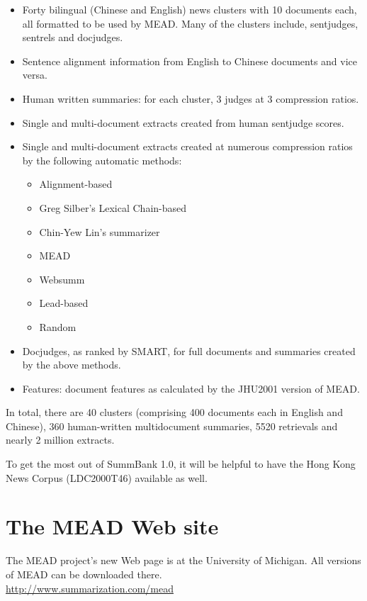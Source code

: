 \documentclass[10pt]{article}
\begin{document}
\begin{itemize}
\item Forty bilingual (Chinese and English) news clusters with 10 documents each, all 
formatted to be used by MEAD.  Many of the clusters include, sentjudges, sentrels and 
docjudges.
\item Sentence alignment information from English to Chinese documents and vice versa.
\item Human written summaries: for each cluster, 3 judges at 3 compression ratios. 
\item Single and multi-document extracts created from human sentjudge scores.
\item Single and multi-document extracts created at numerous compression ratios by the 
following automatic methods:
    \begin{itemize}
    \item Alignment-based
    \item Greg Silber's Lexical Chain-based
    \item Chin-Yew Lin's summarizer
    \item MEAD
    \item Websumm 
    \item Lead-based
    \item Random
    \end{itemize}
\item Docjudges, as ranked by SMART, for full documents and summaries created by the 
above methods.

\item Features: document features as calculated by the JHU2001 version of MEAD.
\end{itemize}

In total, there are 40 clusters (comprising 400 documents each in English and Chinese), 
360 human-written multidocument summaries, 5520 retrievals and nearly 
2 million extracts.

To get the most out of SummBank 1.0, it will be helpful to have the Hong Kong 
News Corpus (LDC2000T46) available as well.

\section{The MEAD Web site}

The MEAD project's new Web page is at the University of
Michigan.  All versions of MEAD can be downloaded there.\\

 \url{http://www.summarization.com/mead}\\
\end{document}
